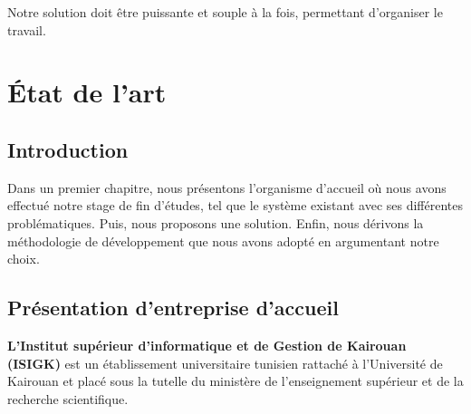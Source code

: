 \documentclass[12 pt]{report}
\begin{document}
Notre solution doit être puissante et souple à la fois, permettant d’organiser le travail.


\newpage
\chapter{État de l'art}
\section*{Introduction}  
Dans un premier chapitre, nous présentons l’organisme d’accueil où nous avons effectué notre stage de fin d’études, tel que le système existant avec ses différentes problématiques.
Puis, nous proposons une solution. Enfin, nous dérivons la méthodologie de développement que nous avons adopté en argumentant notre choix.
\section{Présentation d’entreprise d’accueil }

\textbf{ L'Institut supérieur d'informatique et de Gestion de Kairouan (ISIGK) }est un établissement universitaire tunisien rattaché à l'Université de Kairouan et placé sous la tutelle
du ministère de l'enseignement supérieur et de la recherche scientifique.
\\
\end{document}
